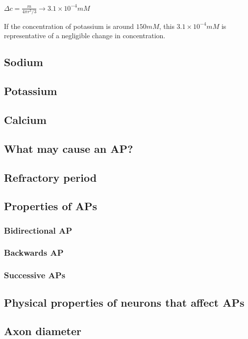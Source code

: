 \documentclass[12pt]{amsart}
\begin{document}
\begin{center}

    $\Delta c = \frac{m}{4\pi r^3 /3} \rightarrow 3.1 \times 10^{-4} mM$
    
\end{center}

\bigskip

If the concentration of potassium is around $150mM$, this $3.1 \times 10^{-4} mM$ is representative of a negligible change in concentration. 


\subsection{Sodium}
\subsection{Potassium}
\subsection{Calcium}
\subsection{What may cause an AP?}
\subsection{Refractory period}
\subsection{Properties of APs}
\subsubsection{Bidirectional AP}
\subsubsection{Backwards AP}
\subsubsection{Successive APs}
\subsection{Physical properties of neurons that affect APs}
\subsection{Axon diameter}
\end{document}
